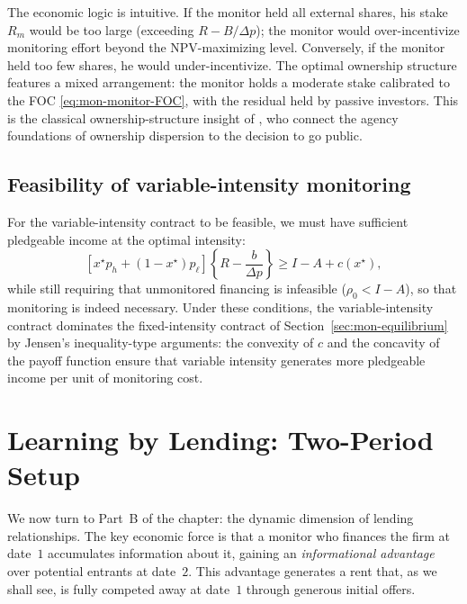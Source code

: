 \documentclass[11pt,a4paper,oneside]{book}
\def\geq{\geqslant}
\theoremstyle{plain}
\theoremstyle{definition}
\theoremstyle{remark}
\numberwithin{equation}{chapter}
\begin{document}
The economic logic is intuitive.
If the monitor held all external shares, his stake $R_m$ would be too large (exceeding $R - B/\Delta p$); the monitor would over-incentivize monitoring effort beyond the NPV-maximizing level.
Conversely, if the monitor held too few shares, he would under-incentivize.
The optimal ownership structure features a mixed arrangement: the monitor holds a moderate stake calibrated to the FOC \eqref{eq:mon-monitor-FOC}, with the residual held by passive investors.
This is the classical ownership-structure insight of \citet{PaganoRoell1998}, who connect the agency foundations of ownership dispersion to the decision to go public.

\subsection{Feasibility of variable-intensity monitoring}

For the variable-intensity contract to be feasible, we must have sufficient pledgeable income at the optimal intensity:
\begin{equation}\label{eq:mon-feasibility-variable}
  [x^\star p_h + (1 - x^\star) p_\ell]\left\{R - \frac{b}{\Delta p}\right\} \geq I - A + c(x^\star),
\end{equation}
while still requiring that unmonitored financing is infeasible ($\rho_0 < I - A$), so that monitoring is indeed necessary.
Under these conditions, the variable-intensity contract dominates the fixed-intensity contract of Section~\ref{sec:mon-equilibrium} by Jensen's inequality-type arguments: the convexity of $c$ and the concavity of the payoff function ensure that variable intensity generates more pledgeable income per unit of monitoring cost.

\section{Learning by Lending: Two-Period Setup}
\label{sec:mon-learning}

We now turn to Part~B of the chapter: the dynamic dimension of lending relationships.
The key economic force is that a monitor who finances the firm at date~$1$ accumulates information about it, gaining an \emph{informational advantage} over potential entrants at date~$2$.
This advantage generates a rent that, as we shall see, is fully competed away at date~$1$ through generous initial offers.
\end{document}
